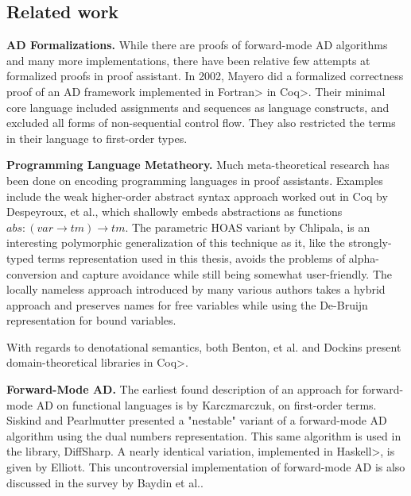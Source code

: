 \subsection{Related work}\label{sec:related-work}
\textbf{AD Formalizations.} While there are proofs of forward-mode AD algorithms\cite{huot2020correctness}\cite{barthe2020versatility}\cite{10.1145/3371106} and many more implementations\cite{Shaikha2019}\cite{Margossian2019ARO}, there have been relative few attempts at formalized proofs in proof assistant.
In 2002, Mayero did a formalized correctness proof of an AD framework implemented in \<Fortran> in \<Coq>\cite{Mayero:CorrectnessProofAD}.
Their minimal core language included assignments and sequences as language constructs, and excluded all forms of non-sequential control flow.
They also restricted the terms in their language to first-order types.

\textbf{Programming Language Metatheory.} Much meta-theoretical research has been done on encoding programming languages in proof assistants\cite{Aydemir2005}.
Examples include the weak higher-order abstract syntax approach worked out in Coq by Despeyroux, et al.\cite{10.1007/BFb0014049}, which shallowly embeds abstractions as functions $abs : (var \to tm) \to tm$.
The parametric HOAS variant by Chlipala\cite{10.1145/1411204.1411226}, is an interesting polymorphic generalization of this technique as it, like the strongly-typed terms representation used in this thesis, avoids the problems of alpha-conversion and capture avoidance while still being somewhat user-friendly.
The locally nameless approach introduced by many various authors\cite{McKinna_Pollack_1997}\cite{10.1007/3-540-57826-9_152}\cite{10.1145/1017472.1017477} takes a hybrid approach and preserves names for free variables while using the De-Bruijn representation for bound variables.

With regards to denotational semantics, both Benton, et al.\cite{Benton2009} and Dockins\cite{Dockins2014} present domain-theoretical libraries in \<Coq>.

\textbf{Forward-Mode AD.}
The earliest found description of an approach for forward-mode AD on functional languages is by Karczmarczuk\cite{Karczmarczuk98functionaldifferentiation}, on first-order terms.
Siskind and Pearlmutter presented a "nestable" variant of a forward-mode AD algorithm using the dual numbers representation.
This same algorithm is used in the \FS{} library, DiffSharp\cite{Baydin2015AutomaticDI}.
A nearly identical variation, implemented in \<Haskell>, is given by Elliott\cite{Elliott2009-beautiful-differentiation}.
This uncontroversial implementation of forward-mode AD is also discussed in the survey by Baydin et al.\cite{Baydin2015AutomaticDI}.

